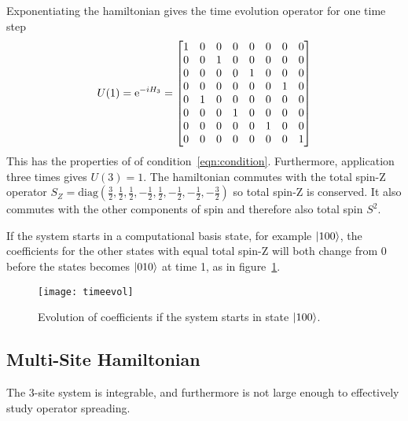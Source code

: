 
Exponentiating the hamiltonian gives the time evolution operator for one time step
\begin{align}
U(1) = \text{e}^{-iH_3} = \begin{bmatrix}
1 & 0 & 0 & 0 & 0 & 0 & 0 & 0 \\
0 & 0 & 1 & 0 & 0 & 0 & 0 & 0 \\
0 & 0 & 0 & 0 & 1 & 0 & 0 & 0 \\
0 & 0 & 0 & 0 & 0 & 0 & 1 & 0 \\
0 & 1 & 0 & 0 & 0 & 0 & 0 & 0 \\
0 & 0 & 0 & 1 & 0 & 0 & 0 & 0 \\
0 & 0 & 0 & 0 & 0 & 1 & 0 & 0 \\
0 & 0 & 0 & 0 & 0 & 0 & 0 & 1
\end{bmatrix}
\end{align}
This has the properties of of condition~\ref{eqn:condition}. Furthermore, application three times gives $U(3) = 1$. The hamiltonian commutes with the total spin-Z operator $S_Z = \text{diag}(\frac{3}{2}, \frac{1}{2}, \frac{1}{2}, -\frac{1}{2}, \frac{1}{2}, -\frac{1}{2}, -\frac{1}{2}, -\frac{3}{2})$ so total spin-Z is conserved. It also commutes with the other components of spin and therefore also total spin $S^2$.

If the system starts in a computational basis state, for example $\left|100\right\rangle$, the coefficients for the other states with equal total spin-Z will both change from 0 before the states becomes $\left|010\right\rangle$ at time 1, as in figure~\ref{fig:timeevol}.
\begin{figure}
	\centering
	\texttt{[image: timeevol]}
	\caption{Evolution of coefficients if the system starts in state $\left|100\right\rangle$.}
	\label{fig:timeevol}
\end{figure}

\subsection{Multi-Site Hamiltonian} \label{sub:multistate}

The 3-site system is integrable, and furthermore is not large enough to effectively study operator spreading.

